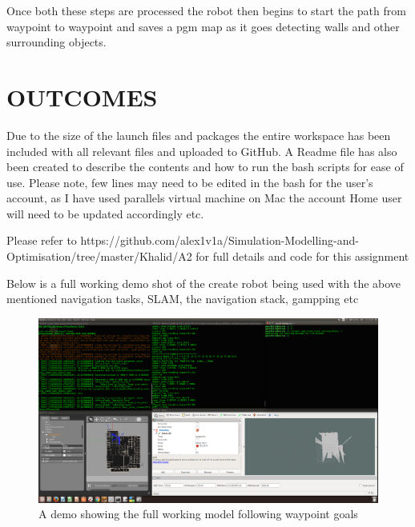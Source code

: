 \documentclass[a4paper, 10pt]{IEEEconf}
\begin{document}
Once both these steps are processed the robot then begins to start the path from waypoint to waypoint and saves a pgm map as it goes detecting walls and other surrounding objects.
 



\clearpage
\section{OUTCOMES}


Due to the size of the launch files and packages the entire workspace has been included with all relevant files and uploaded to GitHub. A Readme file has also been created to describe the contents and how to run the bash scripts for ease of use. Please note, few lines may need to be edited in the bash for the user's account, as I have used parallels virtual machine on Mac the account Home user will need to be updated accordingly etc.

Please refer to https://github.com/alex1v1a/Simulation-Modelling-and-Optimisation/tree/master/Khalid/A2 for full details and code for this assignment

Below is a full working demo shot of the create robot being used with the above mentioned navigation tasks, SLAM, the navigation stack, gampping etc

\begin{figure}[H]
  \includegraphics[width=\linewidth, center]{images/demo}
  \caption{A demo showing the full working model following waypoint goals}
  \label{fig:A demo showing the full working model following waypoint goals}
\end{figure}
\end{document}
